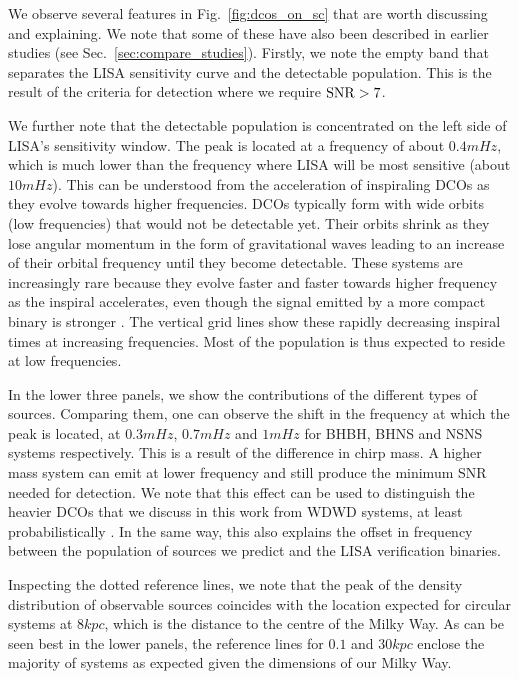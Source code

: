 \vspace{1em}

We observe several features in Fig.~\ref{fig:dcos_on_sc} that are worth discussing and explaining. We note that some of these have also been described in earlier studies (see Sec.~\ref{sec:compare_studies}). Firstly, we note the empty band that separates the LISA sensitivity curve and the detectable population. This is the result of the criteria for detection where we require $\rm{SNR} > 7$.

We further note that the detectable population is concentrated on the left side of LISA's sensitivity window. The peak is located at a frequency of about $0.4 \unit{mHz}$, which is much lower than the frequency where LISA will be most sensitive (about $10 \unit{mHz}$). This can be understood from the acceleration of inspiraling DCOs as they evolve towards higher frequencies. DCOs typically form with wide orbits (low frequencies) that would not be detectable yet. Their orbits shrink as they lose angular momentum in the form of gravitational waves leading to an increase of their orbital frequency until they become detectable. These systems are increasingly rare because they evolve faster and faster towards higher frequency as the inspiral accelerates, even though the signal emitted by a more compact binary is stronger \citep{Peters+1964}. The vertical grid lines show these rapidly decreasing inspiral times at increasing frequencies. Most of the population is thus expected to reside at low frequencies.

In the lower three panels, we show the contributions of the different types of sources. Comparing them, one can observe the shift in the frequency at which the peak is located, at $0.3 \unit{mHz}$, $0.7 \unit{mHz}$ and $1 \unit{mHz}$ for BHBH, BHNS and NSNS systems respectively. This is a result of the difference in chirp mass. A higher mass system can emit at lower frequency and still produce the minimum SNR needed for detection. We note that this effect can be used to distinguish the heavier DCOs that we discuss in this work from WDWD systems, at least probabilistically \citep[e.g.][]{Sesana+2020}. In the same way, this also explains the offset in frequency between the population of sources we predict and the LISA verification binaries.

Inspecting the dotted reference lines, we note that the peak of the density distribution of observable sources coincides with the location expected for circular systems at $8 \unit{kpc}$, which is the distance to the centre of the Milky Way. As can be seen best in the lower panels, the reference lines for $0.1$ and $30 \unit{kpc}$ enclose the majority of systems as expected given the dimensions of our Milky Way.


